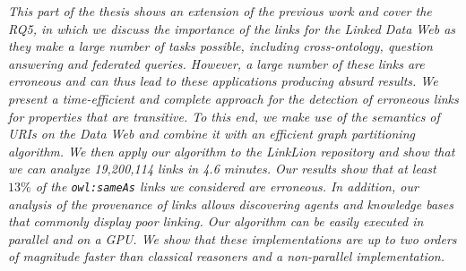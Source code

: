 \textit{This part of the thesis shows an extension of the previous work\cite{valdestilhasdbpediasameas} and cover the RQ5, in which we discuss the importance of the links for the Linked Data Web as they make a large number of tasks possible, including  cross-ontology, question answering and federated queries. However, a large number of these links are erroneous and can thus lead to these applications producing absurd results. We present a time-efficient and complete approach for the detection of erroneous links for properties that are transitive.
To this end, we make use of the semantics of URIs on the Data Web and combine it with an efficient graph partitioning algorithm. 
We then apply our algorithm to the LinkLion repository and show that we can analyze 19,200,114 links in 4.6 minutes. Our results show that at least $13\%$ of the \texttt{owl:sameAs} links we considered are erroneous. In addition, our analysis of the  provenance of links allows discovering agents and knowledge bases that commonly display poor linking.
Our algorithm can be easily executed in parallel and on a GPU. We show that these implementations are up to two orders of magnitude faster than classical reasoners and a non-parallel implementation.}

